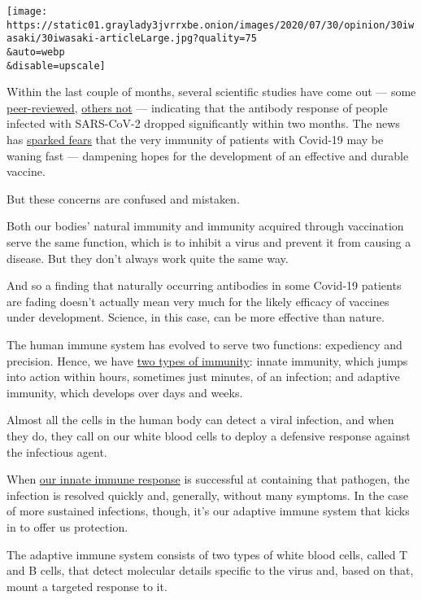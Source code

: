 \texttt{[image: https://static01.graylady3jvrrxbe.onion/images/2020/07/30/opinion/30iwasaki/30iwasaki-articleLarge.jpg?quality=75\\\&auto=webp\\\&disable=upscale]}

Within the last couple of months, several scientific studies have come
out --- some
\href{https://www.nature.com/articles/s41591-020-0965-6}{peer-reviewed},
\href{https://www.medrxiv.org/content/10.1101/2020.07.09.20148429v1.full.pdf}{others
not} --- indicating that the antibody response of people infected with
SARS-CoV-2 dropped significantly within two months. The news has
\href{https://www.sfchronicle.com/health/article/With-coronavirus-antibodies-fading-fast-focus-15414533.php}{sparked
fears} that the very immunity of patients with Covid-19 may be waning
fast --- dampening hopes for the development of an effective and durable
vaccine.

But these concerns are confused and mistaken.

Both our bodies' natural immunity and immunity acquired through
vaccination serve the same function, which is to inhibit a virus and
prevent it from causing a disease. But they don't always work quite the
same way.

And so a finding that naturally occurring antibodies in some Covid-19
patients are fading doesn't actually mean very much for the likely
efficacy of vaccines under development. Science, in this case, can be
more effective than nature.

The human immune system has evolved to serve two functions: expediency
and precision. Hence, we have
\href{https://www.nature.com/articles/ni.3123}{two types of immunity}:
innate immunity, which jumps into action within hours, sometimes just
minutes, of an infection; and adaptive immunity, which develops over
days and weeks.

Almost all the cells in the human body can detect a viral infection, and
when they do, they call on our white blood cells to deploy a defensive
response against the infectious agent.

When \href{https://www.ncbi.nlm.nih.gov/pmc/articles/PMC5480291/}{our
innate immune response} is successful at containing that pathogen, the
infection is resolved quickly and, generally, without many symptoms. In
the case of more sustained infections, though, it's our adaptive immune
system that kicks in to offer us protection.

The adaptive immune system consists of two types of white blood cells,
called T and B cells, that detect molecular details specific to the
virus and, based on that, mount a targeted response to it.

